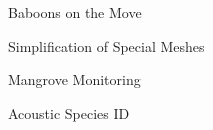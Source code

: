 \item Baboons on the Move
\item Simplification of Special Meshes
\item Mangrove Monitoring
\item Acoustic Species ID
